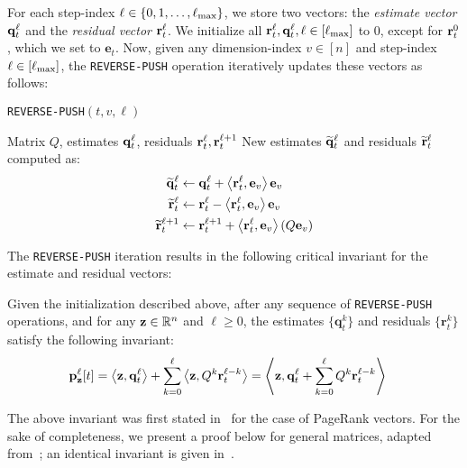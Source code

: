 For each step-index $\ell\in\{0,1,\ldots,\ell_{\max}\}$, we store two vectors: the \emph{estimate vector} $\mathbf{q}^{\ell}_t$ and the \emph{residual vector} $\mathbf{r}^{\ell}_t$.
We initialize all $\mathbf{r}^{\ell}_t,\mathbf{q}^{\ell}_t, \ell\in[\ell_{\max}]$ to $0$, except for $\mathbf{r}^{0}_t$, which we set to $\mathbf{e}_t$.
Now, given any dimension-index $v\in[n]$ and step-index $\ell\in[\ell_{\max}]$, the \texttt{REVERSE-PUSH} operation iteratively updates these vectors as follows:
\begin{algorithm}[!ht]
\caption{\texttt{REVERSE-PUSH}$(t,v,\ell)$}
\label{alg:push}
\begin{algorithmic}[1]
\REQUIRE Matrix $Q$, estimates $\mathbf{q}^{\ell}_t$, residuals $\mathbf{r}^{\ell}_t,\mathbf{r}^{\ell+1}_t$
\RETURN New estimates $\widetilde{\mathbf{q}}^{\ell}_t$ and residuals $\widetilde{\mathbf{r}}^{\ell}_t$ computed as:
\begin{align*}
	\widetilde{\mathbf{q}}^{\ell}_t &\leftarrow \mathbf{q}^{\ell}_t + \left< \mathbf{r}^{\ell}_t, \mathbf{e}_v \right>\mathbf{e}_v \\
	\widetilde{\mathbf{r}}^{\ell}_t &\leftarrow \mathbf{r}^{\ell}_t - \left< \mathbf{r}^{\ell}_t, \mathbf{e}_v \right>\mathbf{e}_v \\
	\widetilde{\mathbf{r}}^{\ell+1}_t &\leftarrow \mathbf{r}^{\ell+1}_t + \left< \mathbf{r}^{\ell}_t, \mathbf{e}_v \right>(Q\mathbf{e}_v)
\end{align*}	
\end{algorithmic}
\end{algorithm}    

The \texttt{REVERSE-PUSH} iteration results in the following critical invariant for the estimate and residual vectors:
\begin{lemma}
\label{lem:pushinvariant}
Given the initialization described above, after any sequence of \texttt{REVERSE-PUSH} operations, and for any $\mathbf{z}\in\mathbb{R}^n$ and $\ell\geq 0$, the estimates $\{\mathbf{q}_t^k\}$ and residuals $\{\mathbf{r}_t^k\}$  satisfy the following invariant:
\begin{align*}
\mathbf{p}_{\mathbf{z}}^{\ell}[t] &= \left< \mathbf{z}, \mathbf{q}_t^{\ell} \right> + \sum_{k=0}^{\ell} \left<\mathbf{z}, Q^k\mathbf{r}_t^{\ell-k}\right> = \left< \mathbf{z}, \mathbf{q}_t^{\ell}  + \sum_{k=0}^{\ell} Q^k\mathbf{r}_t^{\ell-k}\right>
\end{align*}
\end{lemma}

The above invariant was first stated in~\cite{andersen2007local} for the case of PageRank vectors. 
For the sake of completeness, we present a proof below for general matrices, adapted from~\cite{Lofgren2014}; an identical invariant is given in~\cite{lee2014asynchronous}.

